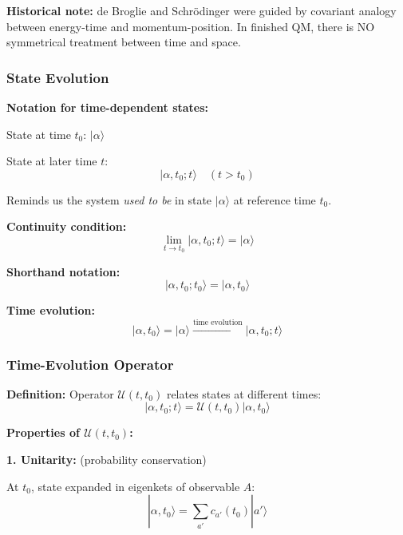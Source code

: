 \documentclass[11pt,a4paper]{article}
\begin{document}
\textbf{Historical note:} de Broglie and Schrödinger were guided by covariant analogy between energy-time and momentum-position. In finished QM, there is NO symmetrical treatment between time and space.

\subsubsection{State Evolution}

\textbf{Notation for time-dependent states:}

State at time $t_0$: $|\alpha\rangle$

State at later time $t$:
\begin{equation}
|\alpha, t_0; t\rangle \quad (t > t_0)
\tag{2.1}
\end{equation}

Reminds us the system \textit{used to be} in state $|\alpha\rangle$ at reference time $t_0$.

\textbf{Continuity condition:}
\begin{equation}
\lim_{t \to t_0}|\alpha, t_0; t\rangle = |\alpha\rangle
\tag{2.2}
\end{equation}

\textbf{Shorthand notation:}
\begin{equation}
|\alpha, t_0; t_0\rangle = |\alpha, t_0\rangle
\tag{2.3}
\end{equation}

\textbf{Time evolution:}
\begin{equation}
|\alpha, t_0\rangle = |\alpha\rangle \xrightarrow{\text{time evolution}} |\alpha, t_0; t\rangle
\tag{2.4}
\end{equation}

\subsubsection{Time-Evolution Operator}

\textbf{Definition:} Operator $\mathscr{U}(t, t_0)$ relates states at different times:
\begin{equation}
\boxed{|\alpha, t_0; t\rangle = \mathscr{U}(t, t_0)|\alpha, t_0\rangle}
\tag{2.5}
\end{equation}

\textbf{Properties of $\mathscr{U}(t, t_0)$:}

\textbf{1. Unitarity:} (probability conservation)

At $t_0$, state expanded in eigenkets of observable $A$:
\begin{equation}
|\alpha, t_0\rangle = \sum_{a'}c_{a'}(t_0)|a'\rangle
\tag{2.6}
\end{equation}
\end{document}
